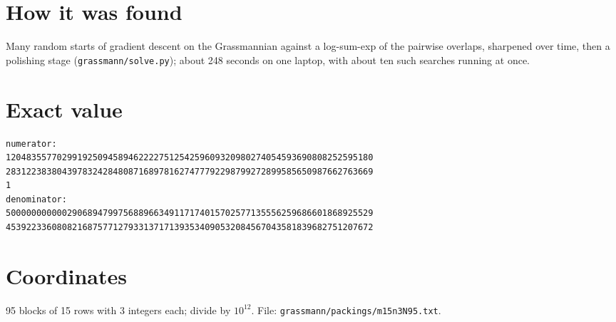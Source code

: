 \documentclass[11pt,a4paper]{article}
\begin{document}
\section{How it was found}
Many random starts of gradient descent on the Grassmannian against a log-sum-exp of the pairwise overlaps, sharpened over time, then a polishing stage (\texttt{grassmann/solve.py}); about 248 seconds on one laptop, with about ten such searches running at once.


\appendix
\section{Exact value}
{\small
\begin{verbatim}
numerator:
120483557702991925094589462222751254259609320980274054593690808252595180
283122383804397832428480871689781627477792298799272899585650987662763669
1
denominator:
500000000000290689479975688966349117174015702577135556259686601868925529
453922336080821687577127933137171393534090532084567043581839682751207672
\end{verbatim}}

\section{Coordinates}
95 blocks of 15 rows with 3 integers each; divide by $10^{12}$. File: \texttt{grassmann/packings/m15n3N95.txt}.
{\tiny
\begin{multicols}{3}
\end{multicols}}
\end{document}
